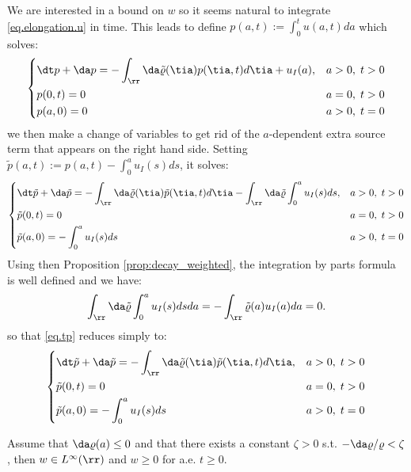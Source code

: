 \documentclass[]{jnsao}
\newcommand{\kernel}{\varrho}
\newcommand{\tkernel}{\tilde{\varrho}}
\newcommand{\tp}{\tilde{p}}
\begin{document}
We are interested in a bound on $w$ so it seems natural to integrate 
\eqref{eq.elongation.u} in time. This leads to define 
$p(a,t) := \int_0^t u(a,t) da$ which solves:
\begin{equation}\label{eq.p}
	\left\{
	\begin{aligned}
		& \dt p + \da p= - \int_\rr \da \tkernel(\tia) p(\tia,t)d \tia + u_I(a),& a>0,\; t>0\\
		& p(0,t)=0 & a=0,\; t>0\\
		& p(a,0)= 0 & a>0,\; t=0
	\end{aligned}
	\right.
\end{equation}
we then make a change of variables to get rid of the $a$-dependent extra source term 
that appears on the right hand side. 
Setting $\tp(a,t) := p(a,t) - \int_0^a u_I(s)ds$, it solves:
 \begin{equation}\label{eq.tp}
 	\left\{
 	\begin{aligned}
 		& \dt \tp + \da \tp= - \int_\rr \da \tkernel(\tia) \tp(\tia,t)d \tia  - \int_\rr \da \tkernel  \int_0^a u_I(s) ds, & a>0,\; t>0\\
 		& \tp(0,t)=0 & a=0,\; t>0\\
 		& \tp(a,0)= - \int_0^a  u_I(s)ds & a>0,\; t=0
 	\end{aligned}
 	\right.
 \end{equation}
 Using then Proposition \ref{prop:decay_weighted}, the integration by parts formula is well defined and we have:
 $$
 \int_\rr \da \tkernel \int_0^a u_I(s)ds da = - \int_\rr \tkernel(a) u_I(a) da = 0.
 $$ 
 so that \eqref{eq.tp} reduces simply to: 
$$
\left\{
\begin{aligned}
	& \dt \tp + \da \tp= - \int_\rr \da \tkernel(\tia) \tp(\tia,t)d \tia ,& a>0,\; t>0\\
	& \tp(0,t)=0 & a=0,\; t>0\\
	& \tp(a,0)= - \int_0^a  u_I(s)ds & a>0,\; t=0
\end{aligned}
\right.
$$

\begin{theorem}\label{thm.w}
	Assume that $\da \kernel (a) \leq 0$ and that there exists a constant $\zeta > 0$ s.t. $- \da \kernel / \kernel < \zeta$, then 
	$w \in L^\infty (\rr)$ and $w \geq 0$ for a.e. $t\geq 0$.
\end{theorem}
\end{document}
